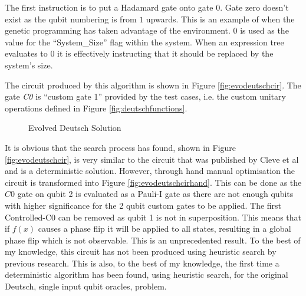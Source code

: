 The first instruction is to put a Hadamard gate onto gate $0$.
Gate zero doesn't exist as the qubit numbering is from $1$ upwards.
This is an example of when the genetic programming has taken advantage of the environment.
$0$ is used as the value for the ``System\_Size'' flag within the system.
When an expression tree evaluates to $0$ it is effectively instructing that it should be replaced by the system's size.

The circuit produced by this algorithm is shown in Figure \ref{fig:evodeutschcir}.
The gate \emph{C0} is ``custom gate 1'' provided by the test cases, i.e. the custom unitary operations defined in Figure \ref{fig:deutschfunctions}.

\begin{figure}
\centering
{}
\caption{Evolved Deutsch Solution}
\end{figure}

It is obvious that the search process has found, shown in Figure \ref{fig:evodeutschcir}, is very similar to the circuit that was published by Cleve et al\cite{Cleve98quantumalgorithms} and is a deterministic solution.
However, through hand manual optimisation the circuit is transformed into Figure \ref{fig:evodeutschcirhand}.
This can be done as the $C0$ gate on qubit 2 is evaluated as a Pauli-I gate as there are not enough qubits with higher significance for the 2 qubit custom gates to be applied.
The first Controlled-C0 can be removed as qubit 1 is not in superposition.
This means that if $f(x)$ causes a phase flip it will be applied to all states, resulting in a global phase flip which is not observable.
This is an unprecedented result.
To the best of my knowledge, this circuit has not been produced using heuristic search by previous research.
This is also, to the best of my knowledge, the first time a deterministic algorithm has been found, using heuristic search, for the original Deutsch, single input qubit oracles, problem.

